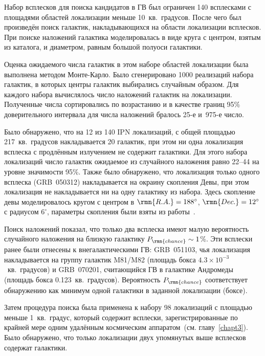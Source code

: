 Набор всплесков для поиска кандидатов в ГВ был ограничен 140 всплесками с 
площадями областей локализации меньше 10~кв.~градусов. После чего был произведён 
поиск галактик, накладывающихся на области локализации всплесков. При поиске наложений 
галактика моделировалась в виде круга с центром, взятым из каталога, и диаметром, 
равным большой полуоси галактики. 

Оценка ожидаемого числа галактик в этом наборе областей локализации была выполнена 
методом Монте-Карло. Было сгенерировано 1000 реализаций набора галактик, в которых 
центры галактик выбирались случайным образом. Для каждого набора вычислялось число 
наложений галактик на локализации. Полученные числа сортировались по возрастанию 
и в качестве границ 95\% доверительного интервала для числа наложений бралось 25-е и~975-е число.

Было обнаружено, что на 12 из 140 IPN локализаций, с общей площадью 217~кв.~градусов 
накладывается 20 галактик, при этом ни одна локализация всплеска с продлённым 
излучением не содержит галактики. Для этого набора локализаций число галактик 
ожидаемое из случайного наложения равно 22--44 на уровне значимости 95\%. 
Также было обнаружено, что локализация только одного всплеска (GRB~050312) 
накладывается на окраину скопления Девы, при этом локализация не накладывается 
ни на одну галактику из набора. Здесь скопление девы моделировалось кругом с центром в 
$\rmn{R.A.}=188^\circ$, $\rmn{Dec.}=12^\circ$ с радиусом $6^\circ$, 
параметры скопления были взяты из работы~\citep{Binggeli1987}.

Поиск наложений показал, что только два всплеска имеют малую вероятность случайного 
наложения на близкую галактику $P_{\rmn{chance}} \sim 1$\%. Эти всплески ранее были 
отнесены к внегалактическими ГВ: GRB~051103, чья локализация накладывается на группу галактик M81/M82 
(площадь бокса $4.3\times10^{-3}$~кв.~градусов) и GRB~070201, считающийся ГВ в галактике 
Андромеды (площадь бокса 0.123~кв.~градусов). Вероятность $P_{\rmn{chance}}$ 
соответствует обнаружению как минимум одной галактики в заданной локализации (боксе).

Затем процедура поиска была применена к набору 98 локализаций с площадью меньше 
1~кв.~градус, который содержит всплески, зарегистрированные по крайней мере одним 
удалённым космическим аппаратом~(см. главу~\ref{chapt3}). Было обнаружено, 
что только локализации двух упомянутых выше всплесков содержат галактики.

